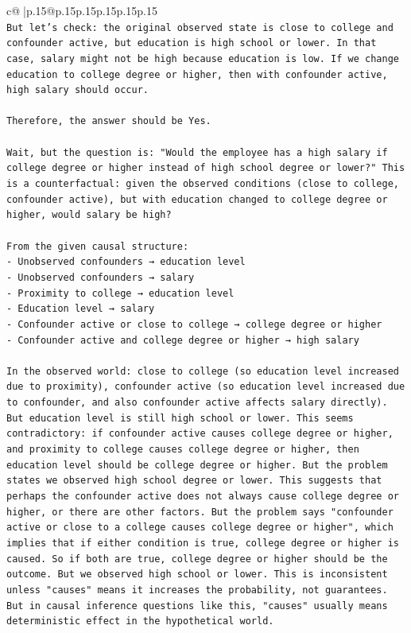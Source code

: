\documentclass{article}
\begin{document}
{\begin{supertabular}{c@{$\;$}|p{.15\linewidth}@{}p{.15\linewidth}p{.15\linewidth}p{.15\linewidth}p{.15\linewidth}p{.15\linewidth}}
{{{\\ 
\texttt{But let's check: the original observed state is close to college and confounder active, but education is high school or lower. In that case, salary might not be high because education is low. If we change education to college degree or higher, then with confounder active, high salary should occur.} \\
\\ 
\texttt{Therefore, the answer should be Yes.} \\
\\ 
\texttt{Wait, but the question is: "Would the employee has a high salary if college degree or higher instead of high school degree or lower?" This is a counterfactual: given the observed conditions (close to college, confounder active), but with education changed to college degree or higher, would salary be high?} \\
\\ 
\texttt{From the given causal structure:} \\
\texttt{{-} Unobserved confounders → education level} \\
\texttt{{-} Unobserved confounders → salary} \\
\texttt{{-} Proximity to college → education level} \\
\texttt{{-} Education level → salary} \\
\texttt{{-} Confounder active or close to college → college degree or higher} \\
\texttt{{-} Confounder active and college degree or higher → high salary} \\
\\ 
\texttt{In the observed world: close to college (so education level increased due to proximity), confounder active (so education level increased due to confounder, and also confounder active affects salary directly). But education level is still high school or lower. This seems contradictory: if confounder active causes college degree or higher, and proximity to college causes college degree or higher, then education level should be college degree or higher. But the problem states we observed high school degree or lower. This suggests that perhaps the confounder active does not always cause college degree or higher, or there are other factors. But the problem says "confounder active or close to a college causes college degree or higher", which implies that if either condition is true, college degree or higher is caused. So if both are true, college degree or higher should be the outcome. But we observed high school or lower. This is inconsistent unless "causes" means it increases the probability, not guarantees. But in causal inference questions like this, "causes" usually means deterministic effect in the hypothetical world.} \\
}}}
\end{supertabular}}
\end{document}
